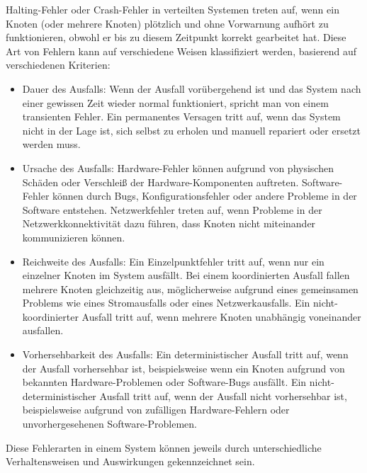 \documentclass[../vs-script-first-v01.tex]{subfiles}
\begin{document}
Halting-Fehler oder Crash-Fehler in verteilten Systemen treten auf, wenn ein Knoten (oder mehrere Knoten) plötzlich und ohne Vorwarnung aufhört zu funktionieren, obwohl er bis zu diesem Zeitpunkt korrekt gearbeitet hat. Diese Art von Fehlern kann auf verschiedene Weisen klassifiziert werden, basierend auf verschiedenen Kriterien:
\begin{itemize}
\item Dauer des Ausfalls: Wenn der Ausfall vorübergehend ist und das System nach einer gewissen Zeit wieder normal funktioniert, spricht man von einem transienten Fehler. Ein permanentes Versagen tritt auf, wenn das System nicht in der Lage ist, sich selbst zu erholen und manuell repariert oder ersetzt werden muss.
\item Ursache des Ausfalls: Hardware-Fehler können aufgrund von physischen Schäden oder Verschleiß der Hardware-Komponenten auftreten. Software-Fehler können durch Bugs, Konfigurationsfehler oder andere Probleme in der Software entstehen. Netzwerkfehler treten auf, wenn Probleme in der Netzwerkkonnektivität dazu führen, dass Knoten nicht miteinander kommunizieren können.
\item Reichweite des Ausfalls: Ein Einzelpunktfehler tritt auf, wenn nur ein einzelner Knoten im System ausfällt. Bei einem koordinierten Ausfall fallen mehrere Knoten gleichzeitig aus, möglicherweise aufgrund eines gemeinsamen Problems wie eines Stromausfalls oder eines Netzwerkausfalls. Ein nicht-koordinierter Ausfall tritt auf, wenn mehrere Knoten unabhängig voneinander ausfallen.
\item Vorhersehbarkeit des Ausfalls: Ein deterministischer Ausfall tritt auf, wenn der Ausfall vorhersehbar ist, beispielsweise wenn ein Knoten aufgrund von bekannten Hardware-Problemen oder Software-Bugs ausfällt. Ein nicht-deterministischer Ausfall tritt auf, wenn der Ausfall nicht vorhersehbar ist, beispielsweise aufgrund von zufälligen Hardware-Fehlern oder unvorhergesehenen Software-Problemen.
\end{itemize} 
Diese Fehlerarten in einem System können jeweils durch unterschiedliche Verhaltensweisen und Auswirkungen gekennzeichnet sein.
\end{document}
